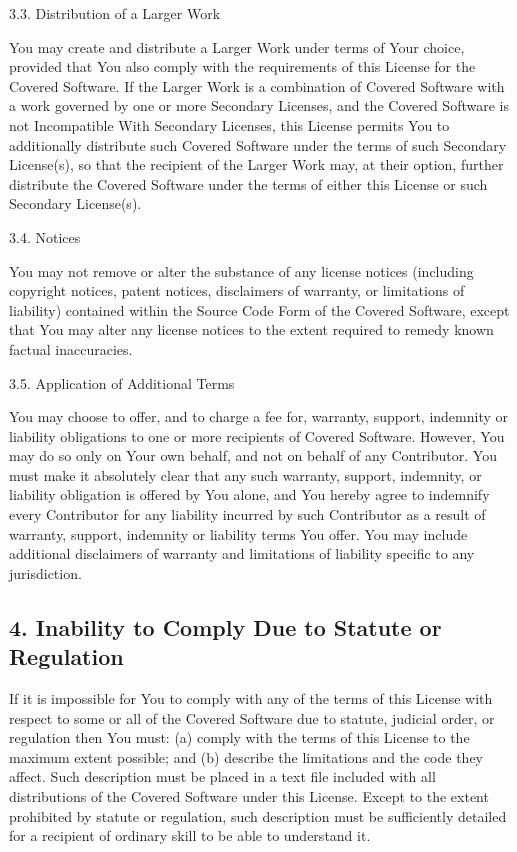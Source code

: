 \documentclass[letterpaper,10pt,openany,oneside,english]{sphinxmanual}
\begin{document}
3.3. Distribution of a Larger Work

You may create and distribute a Larger Work under terms of Your choice,
provided that You also comply with the requirements of this License for
the Covered Software. If the Larger Work is a combination of Covered
Software with a work governed by one or more Secondary Licenses, and the
Covered Software is not Incompatible With Secondary Licenses, this
License permits You to additionally distribute such Covered Software
under the terms of such Secondary License(s), so that the recipient of
the Larger Work may, at their option, further distribute the Covered
Software under the terms of either this License or such Secondary
License(s).

3.4. Notices

You may not remove or alter the substance of any license notices
(including copyright notices, patent notices, disclaimers of warranty,
or limitations of liability) contained within the Source Code Form of
the Covered Software, except that You may alter any license notices to
the extent required to remedy known factual inaccuracies.

3.5. Application of Additional Terms

You may choose to offer, and to charge a fee for, warranty, support,
indemnity or liability obligations to one or more recipients of Covered
Software. However, You may do so only on Your own behalf, and not on
behalf of any Contributor. You must make it absolutely clear that any
such warranty, support, indemnity, or liability obligation is offered by
You alone, and You hereby agree to indemnify every Contributor for any
liability incurred by such Contributor as a result of warranty, support,
indemnity or liability terms You offer. You may include additional
disclaimers of warranty and limitations of liability specific to any
jurisdiction.


\subsection{4. Inability to Comply Due to Statute or Regulation}
\label{\detokenize{warranty:inability-to-comply-due-to-statute-or-regulation}}
If it is impossible for You to comply with any of the terms of this
License with respect to some or all of the Covered Software due to
statute, judicial order, or regulation then You must: (a) comply with
the terms of this License to the maximum extent possible; and (b)
describe the limitations and the code they affect. Such description must
be placed in a text file included with all distributions of the Covered
Software under this License. Except to the extent prohibited by statute
or regulation, such description must be sufficiently detailed for a
recipient of ordinary skill to be able to understand it.
\end{document}
